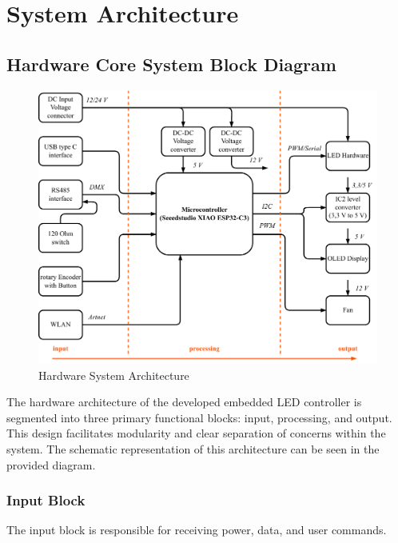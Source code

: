 \section{System Architecture}
\label{sec:system_architecture}
\subsection{Hardware Core System Block Diagram}
\begin{figure}[H]
	\centering
	\includegraphics[width=0.95\linewidth]{graphics/hardware_architecture}
	\caption{Hardware System Architecture}
	\label{fig:hardwarearchitecture}
\end{figure}
The hardware architecture of the developed embedded \ac{LED} controller is segmented into three primary functional blocks: input, processing, and output. This design facilitates modularity and clear separation of concerns within the system. The schematic representation of this architecture can be seen in the provided diagram.

\subsubsection*{Input Block}

The input block is responsible for receiving power, data, and user commands.

